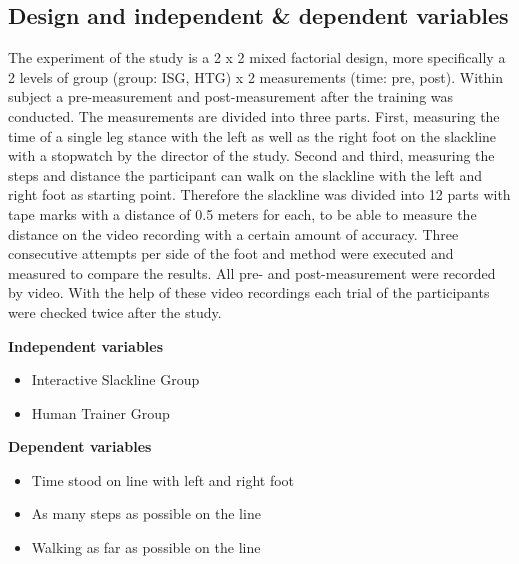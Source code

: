 \todo{[Figure]}


\subsection{Design and independent \& dependent variables}\label{6_variables}
The experiment of the study is a 2 x 2 mixed factorial design, more specifically a 2 levels of group (group: ISG, HTG)  x 2 measurements (time: pre, post).
Within subject a pre-measurement and post-measurement after the training was conducted.
The measurements are divided into three parts.
First, measuring the time of a single leg stance with the left as well as the right foot on the slackline with a stopwatch by the director of the study.
Second and third, measuring the steps and distance the participant can walk on the slackline with the left and right foot as starting point.
Therefore the slackline was divided into 12 parts with tape marks with a distance of 0.5 meters for each, to be able to measure the distance on the video recording with a certain amount of accuracy.
Three consecutive attempts per side of the foot and method were executed and measured to compare the results.
All pre- and post-measurement were recorded by video.
With the help of these video recordings each trial of the participants were checked twice after the study.

\textbf{Independent variables}
\begin{itemize}
\item Interactive Slackline Group
\item Human Trainer Group
\end{itemize}

\textbf{Dependent variables}
\begin{itemize}
\item Time stood on line with left and right foot
\item As many steps as possible on the line 
\item Walking as far as possible on the line
\end{itemize}




